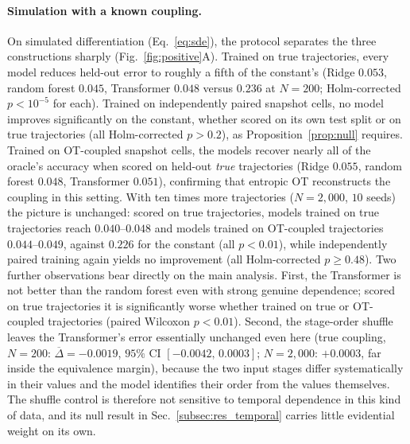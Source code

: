 \documentclass[pdflatex,sn-mathphys-num]{sn-jnl}
\theoremstyle{thmstyleone}%
\theoremstyle{thmstyletwo}%
\theoremstyle{thmstylethree}%
\begin{document}
\paragraph{Simulation with a known coupling.} On simulated differentiation (Eq.~\eqref{eq:sde}), the protocol separates the three constructions sharply (Fig.~\ref{fig:positive}A). Trained on true trajectories, every model reduces held-out error to roughly a fifth of the constant's (Ridge $0.053$, random forest $0.045$, Transformer $0.048$ versus $0.236$ at $N=200$; Holm-corrected $p<10^{-5}$ for each). Trained on independently paired snapshot cells, no model improves significantly on the constant, whether scored on its own test split or on true trajectories (all Holm-corrected $p>0.2$), as Proposition~\ref{prop:null} requires. Trained on OT-coupled snapshot cells, the models recover nearly all of the oracle's accuracy when scored on held-out \emph{true} trajectories (Ridge $0.055$, random forest $0.048$, Transformer $0.051$), confirming that entropic OT reconstructs the coupling in this setting. With ten times more trajectories ($N=2{,}000$, $10$ seeds) the picture is unchanged: scored on true trajectories, models trained on true trajectories reach $0.040$--$0.048$ and models trained on OT-coupled trajectories $0.044$--$0.049$, against $0.226$ for the constant (all $p<0.01$), while independently paired training again yields no improvement (all Holm-corrected $p\ge0.48$). Two further observations bear directly on the main analysis. First, the Transformer is not better than the random forest even with strong genuine dependence; scored on true trajectories it is significantly worse whether trained on true or OT-coupled trajectories (paired Wilcoxon $p<0.01$). Second, the stage-order shuffle leaves the Transformer's error essentially unchanged even here (true coupling, $N=200$: $\overline{\Delta}=-0.0019$, $95\%$ CI $[-0.0042,\,0.0003]$; $N=2{,}000$: $+0.0003$, far inside the equivalence margin), because the two input stages differ systematically in their values and the model identifies their order from the values themselves. The shuffle control is therefore not sensitive to temporal dependence in this kind of data, and its null result in Sec.~\ref{subsec:res_temporal} carries little evidential weight on its own.
\end{document}
